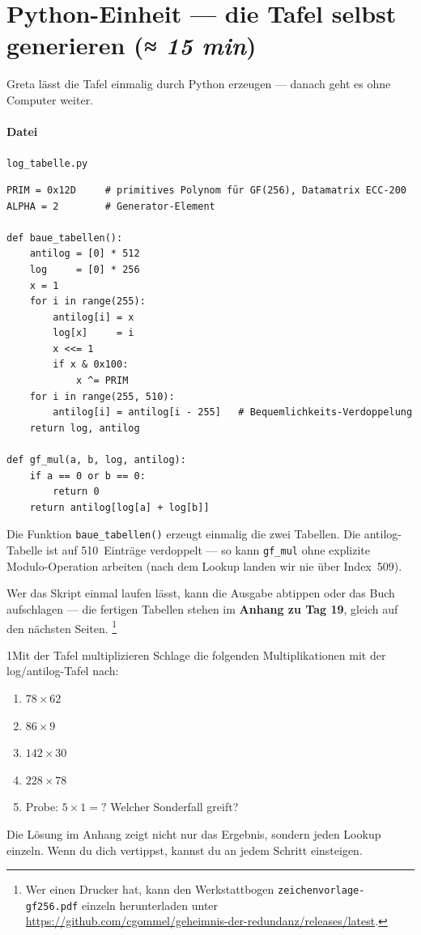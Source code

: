\section{Python-Einheit — die Tafel selbst generieren
         \normalfont(\textit{≈ 15 min})}

Greta lässt die Tafel einmalig durch Python erzeugen — danach geht es
ohne Computer weiter.

\paragraph{Datei} \texttt{log\_tabelle.py}

\begin{verbatim}
PRIM = 0x12D     # primitives Polynom für GF(256), Datamatrix ECC-200
ALPHA = 2        # Generator-Element

def baue_tabellen():
    antilog = [0] * 512
    log     = [0] * 256
    x = 1
    for i in range(255):
        antilog[i] = x
        log[x]     = i
        x <<= 1
        if x & 0x100:
            x ^= PRIM
    for i in range(255, 510):
        antilog[i] = antilog[i - 255]   # Bequemlichkeits-Verdoppelung
    return log, antilog

def gf_mul(a, b, log, antilog):
    if a == 0 or b == 0:
        return 0
    return antilog[log[a] + log[b]]
\end{verbatim}

Die Funktion \texttt{baue\_tabellen()} erzeugt einmalig die zwei
Tabellen. Die antilog-Tabelle ist auf 510~Einträge verdoppelt — so
kann \texttt{gf\_mul} ohne explizite Modulo-Operation arbeiten
(nach dem Lookup landen wir nie über Index~509).

Wer das Skript einmal laufen lässt, kann die Ausgabe abtippen oder
das Buch aufschlagen — die fertigen Tabellen stehen im
\textbf{Anhang zu Tag 19}, gleich auf den nächsten Seiten.%
\footnote{Wer einen Drucker hat, kann den Werkstattbogen
\texttt{zeichenvorlage-gf256.pdf} einzeln herunterladen unter
\url{https://github.com/cgommel/geheimnis-der-redundanz/releases/latest}.}

\begin{bleistiftuebung}{1}{Mit der Tafel multiplizieren}
Schlage die folgenden Multiplikationen mit der log/antilog-Tafel nach:

\begin{enumerate}[label=\alph*)]
\item $78 \times 62$
\item $86 \times 9$
\item $142 \times 30$
\item $228 \times 78$
\item Probe: $5 \times 1 = ?$ Welcher Sonderfall greift?
\end{enumerate}

Die Lösung im Anhang zeigt nicht nur das Ergebnis, sondern jeden Lookup
einzeln. Wenn du dich vertippst, kannst du an jedem Schritt einsteigen.
\end{bleistiftuebung}

